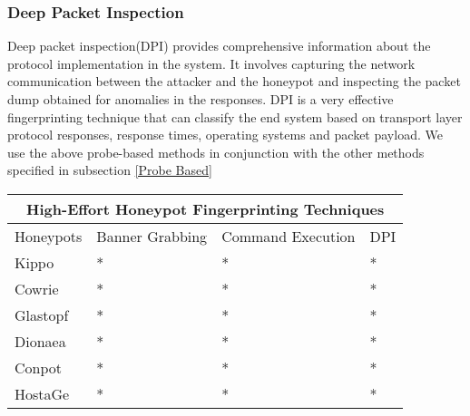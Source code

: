 \subsubsection{Deep Packet Inspection}
Deep packet inspection(DPI) provides comprehensive information about the protocol implementation in the system. It involves capturing the network communication between the attacker and the honeypot and inspecting the packet dump obtained for anomalies in the responses. DPI is a very effective fingerprinting technique that can classify the end system based on transport layer protocol responses, response times, operating systems and packet payload. We use the above probe-based methods in conjunction with the other methods specified in subsection \ref{Probe Based}





\begin{tabular}{ |p{1.5cm}||p{1.5cm}|p{1.5cm}|p{1cm}| }
 \hline
 \multicolumn{4}{|c|}{High-Effort Honeypot Fingerprinting Techniques} \\
 \hline
 Honeypots & Banner Grabbing & Command Execution & DPI \\
 \hline
 Kippo   & *  &* & * \\
 Cowrie  & *  &* & * \\
 Glastopf& *  &* & *  \\
 Dionaea & *  &* & * \\
 Conpot  & *  &* & * \\
 HostaGe & *  &* & * \\
 \hline
\end{tabular}
